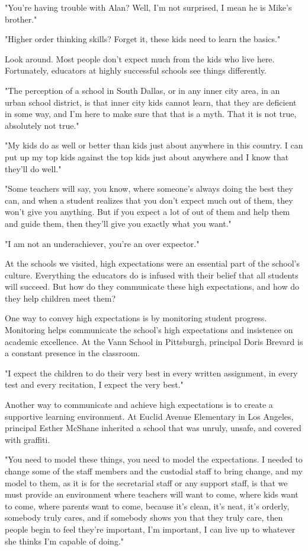 "You're having trouble with Alan? Well, I'm not surprised, I mean he is Mike's brother."

"Higher order thinking skills? Forget it, these kids need to learn the basics."

Look around. Most people don't expect much from the kids who live here. Fortunately, educators at highly successful schools see things differently.

"The perception of a school in South Dallas, or in any inner city area, in an urban school district, is that inner city kids cannot learn, that they are deficient in some way, and I'm here to make sure that that is a myth. That it is not true, absolutely not true."

"My kids do as well or better than kids just about anywhere in this country. I can put up my top kids against the top kids just about anywhere and I know that they'll do well."

"Some teachers will say, you know, where someone's always doing the best they can, and when a student realizes that you don't expect much out of them, they won't give you anything. But if you expect a lot of out of them and help them and guide them, then they'll give you exactly what you want."

"I am not an underachiever, you're an over expector."

At the schools we visited, high expectations were an essential part of the school's culture. Everything the educators do is infused with their belief that all students will succeed. But how do they communicate these high expectations, and how do they help children meet them?

One way to convey high expectations is by monitoring student progress. Monitoring helps communicate the school's high expectations and insistence on academic excellence. At the Vann School in Pittsburgh, principal Doris Brevard is a constant presence in the classroom.

"I expect the children to do their very best in every written assignment, in every test and every recitation, I expect the very best."

Another way to communicate and achieve high expectations is to create a supportive learning environment.
At Euclid Avenue Elementary in Los Angeles, principal Esther McShane inherited a school that was unruly, unsafe, and covered with graffiti.

"You need to model these things, you need to model the expectations. I needed to change some of the staff members and the custodial staff to bring change, and my model to them, as it is for the secretarial staff or any support staff, is that we must provide an environment where teachers will want to come, where kids want to come, where parents want to come, because it's clean, it's neat, it's orderly, somebody truly cares, and if somebody shows you that they truly care, then people begin to feel they're important, I'm important, I can live up to whatever she thinks I'm capable of doing."

